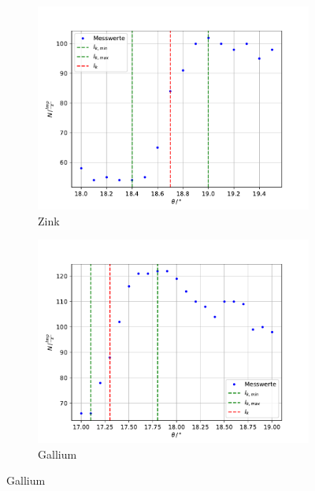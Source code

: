\begin{figure}[t!] %
\begin{subfigure}{0.48\textwidth}
\includegraphics[width=\linewidth]{content/data/zink.pdf}
\caption{Zink} \label{fig:zink}
\end{subfigure}\hspace*{\fill}
\begin{subfigure}{0.48\textwidth}
\includegraphics[width=\linewidth]{content/data/gallium.pdf}
\caption{Gallium} \label{fig:gallium}
\end{subfigure}


\end{figure}
